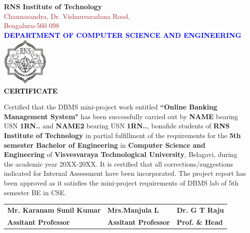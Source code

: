 \begin{titlepage}
\begin{center}
\break\break
\textup{\large {\textcolor{darkbrown}{\bf RNS Institute of Technology}} \\ 
{\normalsize{\textcolor{brown}{Channasandra, Dr. Vishnuvaradana Road,\\ Bengaluru-560 098}}}}\\[0.1in]
\textup{\normalsize {\textcolor{blue}{\bf DEPARTMENT OF COMPUTER SCIENCE AND ENGINEERING}}}\\[0.1in]
\includegraphics[width=0.18\textwidth]{./RNSIT.jpg}\\[0.1in]
\textup{\large {\textcolor{black}{\textbf {CERTIFICATE}}}} \\[0.1in]
\end{center}
\raggedright{
\textup{\hspace{0.5in} Certified that the DBMS mini-project work entitled {\textbf{``Online Banking Management System"}} has been successfully carried out by {\textbf{NAME}} bearing USN {\textbf{1RN..}} and {\textbf{NAME2}} bearing USN {\textbf{1RN..}}, bonafide students of {\textbf{RNS Institute of Technology }} in partial fulfillment of the requirements for the {\textbf{5th semester Bachelor of Engineering}} in {\textbf{Computer Science and Engineering}} of {\textbf{Visvesvaraya Technological University}}, Belagavi, during the academic year 20XX-20XX. It is certified that all corrections/suggestions indicated for Internal Assessment have been incorporated. The project report has been approved as it satisfies the mini-project requirements of DBMS lab of 5th semester BE in CSE.}\\[0.7in]
}
\begin{tabular}{l  l  l}
\textbf{Mr. Karanam Sunil Kumar} & \hspace{0.7cm}\textbf{Mrs.Manjula L} & \hspace{0.7cm}\textbf{Dr. G T Raju}\\
\textbf{Assitant Professor} & \hspace{0.7cm}\textbf{Assitant Professor}  & \hspace{0.7cm}\textbf{Prof. \& Head}\\

\end{tabular}
\end{titlepage}
